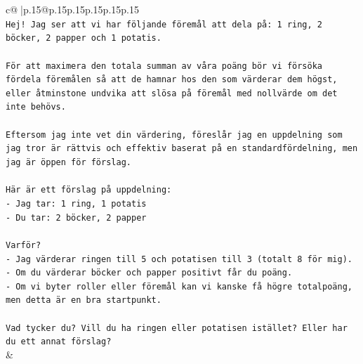 \documentclass{article}
\begin{document}
{\begin{supertabular}{c@{$\;$}|p{.15\linewidth}@{}p{.15\linewidth}p{.15\linewidth}p{.15\linewidth}p{.15\linewidth}p{.15\linewidth}}
{{{\\ 
\texttt{Hej! Jag ser att vi har följande föremål att dela på: 1 ring, 2 böcker, 2 papper och 1 potatis.} \\
\\ 
\texttt{För att maximera den totala summan av våra poäng bör vi försöka fördela föremålen så att de hamnar hos den som värderar dem högst, eller åtminstone undvika att slösa på föremål med nollvärde om det inte behövs.} \\
\\ 
\texttt{Eftersom jag inte vet din värdering, föreslår jag en uppdelning som jag tror är rättvis och effektiv baserat på en standardfördelning, men jag är öppen för förslag.} \\
\\ 
\texttt{Här är ett förslag på uppdelning:} \\
\texttt{{-} Jag tar: 1 ring, 1 potatis} \\
\texttt{{-} Du tar: 2 böcker, 2 papper} \\
\\ 
\texttt{Varför?} \\
\texttt{{-} Jag värderar ringen till 5 och potatisen till 3 (totalt 8 för mig).} \\
\texttt{{-} Om du värderar böcker och papper positivt får du poäng.} \\
\texttt{{-} Om vi byter roller eller föremål kan vi kanske få högre totalpoäng, men detta är en bra startpunkt.} \\
\\ 
\texttt{Vad tycker du? Vill du ha ringen eller potatisen istället? Eller har du ett annat förslag?} \\
            }
        }
    }
    & \\ \\


\end{supertabular}}
\end{document}
